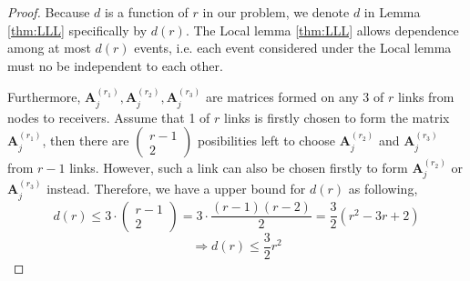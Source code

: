 \begin{proof}
Because $d$ is a function of $r$ in our problem, we denote $d$
in Lemma \ref{thm:LLL} specifically by $d(r)$. The Local lemma \ref{thm:LLL}
allows dependence among at most $d(r)$ events, i.e. each event considered
under the Local lemma must no be independent to each other.

Furthermore, $\boldsymbol{A}_{j}^{\left(r_{1}\right)},\boldsymbol{A}_{j}^{\left(r_{2}\right)},\boldsymbol{A}_{j}^{\left(r_{3}\right)}$
are matrices formed on any 3 of $r$ links from nodes to receivers.
Assume that 1 of $r$ links is firstly chosen to form the matrix $\boldsymbol{A}_{j}^{\left(r_{1}\right)}$,
then there are $\left(\begin{array}{c}
r-1\\
2
\end{array}\right)$ posibilities left to choose $\boldsymbol{A}_{j}^{\left(r_{2}\right)}$
and $\boldsymbol{A}_{j}^{\left(r_{3}\right)}$ from $r-1$ links.
However, such a link can also be chosen firstly to form $\boldsymbol{A}_{j}^{\left(r_{2}\right)}$
or $\boldsymbol{A}_{j}^{\left(r_{3}\right)}$ instead. Therefore,
we have a upper bound for $d(r)$ as following,
\[
d(r)\leq3\cdot\left(\begin{array}{c}
r-1\\
2
\end{array}\right)=3\cdot\frac{\left(r-1\right)\left(r-2\right)}{2}=\frac{3}{2}\left(r^{2}-3r+2\right)
\]
\[
\Rightarrow d(r)\leq\frac{3}{2}r^{2}
\]
\end{proof}
